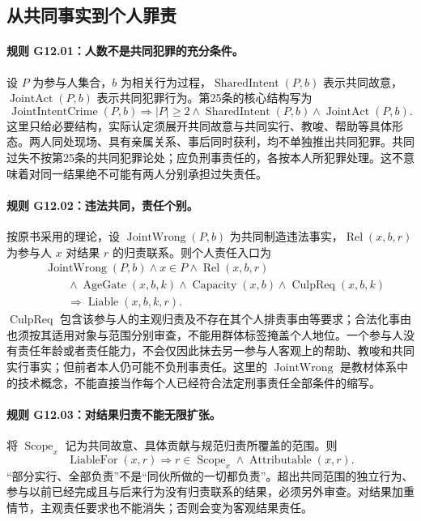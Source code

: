 \subsection{从共同事实到个人罪责}
\paragraph{规则 G12.01：人数不是共同犯罪的充分条件。}
设 $P$ 为参与人集合，$b$ 为相关行为过程，$\operatorname{SharedIntent}(P,b)$ 表示共同故意，$\operatorname{JointAct}(P,b)$ 表示共同犯罪行为。第25条的核心结构写为
\[
\operatorname{JointIntentCrime}(P,b)
\Longrightarrow |P|\ge2\land\operatorname{SharedIntent}(P,b)
\land\operatorname{JointAct}(P,b).
\]
这里只给必要结构，实际认定须展开共同故意与共同实行、教唆、帮助等具体形态。两人同处现场、具有亲属关系、事后同时获利，均不单独推出共同犯罪。共同过失不按第25条的共同犯罪论处；应负刑事责任的，各按本人所犯罪处理。这不意味着对同一结果绝不可能有两人分别承担过失责任。

\paragraph{规则 G12.02：违法共同，责任个别。}
按原书采用的理论，设 $\operatorname{JointWrong}(P,b)$ 为共同制造违法事实，$\operatorname{Rel}(x,b,r)$ 为参与人 $x$ 对结果 $r$ 的归责联系。则个人责任入口为
\[
\begin{aligned}
&\operatorname{JointWrong}(P,b)\land x\in P
\land\operatorname{Rel}(x,b,r)\\
&\qquad\land\operatorname{AgeGate}(x,b,k)
\land\operatorname{Capacity}(x,b)
\land\operatorname{CulpReq}(x,b,k)\\
&\qquad\Longrightarrow\operatorname{Liable}(x,b,k,r).
\end{aligned}
\]
$\operatorname{CulpReq}$ 包含该参与人的主观归责及不存在其个人排责事由等要求；合法化事由也须按其适用对象与范围分别审查，不能用群体标签掩盖个人地位。一个参与人没有责任年龄或者责任能力，不会仅因此抹去另一参与人客观上的帮助、教唆和共同实行事实；但前者本人仍可能不负刑事责任。这里的 $\operatorname{JointWrong}$ 是教材体系中的技术概念，不能直接当作每个人已经符合法定刑事责任全部条件的缩写。

\paragraph{规则 G12.03：对结果归责不能无限扩张。}
将 $\operatorname{Scope}_x$ 记为共同故意、具体贡献与规范归责所覆盖的范围。则
\[
\operatorname{LiableFor}(x,r)\Longrightarrow
r\in\operatorname{Scope}_x\land\operatorname{Attributable}(x,r).
\]
“部分实行、全部负责”不是“同伙所做的一切都负责”。超出共同范围的独立行为、参与以前已经完成且与后来行为没有归责联系的结果，必须另外审查。对结果加重情节，主观责任要求也不能消失；否则会变为客观结果责任。

